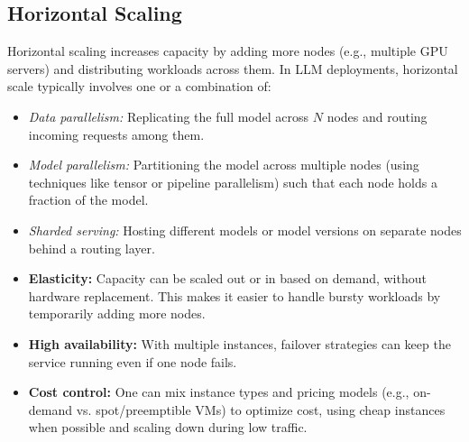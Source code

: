 \subsection{Horizontal Scaling}
\label{sec:scaling-horizontal}
Horizontal scaling increases capacity by adding more nodes (e.g., multiple GPU servers) and distributing workloads across them. In LLM deployments, horizontal scale typically involves one or a combination of:
\begin{itemize}
    \item \emph{Data parallelism:} Replicating the full model across $N$ nodes and routing incoming requests among them.
    \item \emph{Model parallelism:} Partitioning the model across multiple nodes (using techniques like tensor or pipeline parallelism) such that each node holds a fraction of the model.
    \item \emph{Sharded serving:} Hosting different models or model versions on separate nodes behind a routing layer.
\end{itemize}

\begin{tcolorbox}[
  title={\textbf{Horizontal Scaling: Pros}},
  colback=green!5,
  colframe=green!40!black,
  colbacktitle=green!20,
  coltitle=black,
  fonttitle=\bfseries,
  boxrule=0.7pt,
  arc=4pt,
  left=5mm, right=5mm, top=4mm, bottom=4mm,
  before skip=6pt,
  after skip=6pt
]
\begin{itemize}[leftmargin=1.5em, itemsep=3pt]
    \item \textbf{Elasticity:} Capacity can be scaled out or in based on demand, without hardware replacement. This makes it easier to handle bursty workloads by temporarily adding more nodes.
    \item \textbf{High availability:} With multiple instances, failover strategies can keep the service running even if one node fails.
    \item \textbf{Cost control:} One can mix instance types and pricing models (e.g., on-demand vs. spot/preemptible VMs) to optimize cost, using cheap instances when possible and scaling down during low traffic.
\end{itemize}
\end{tcolorbox}

